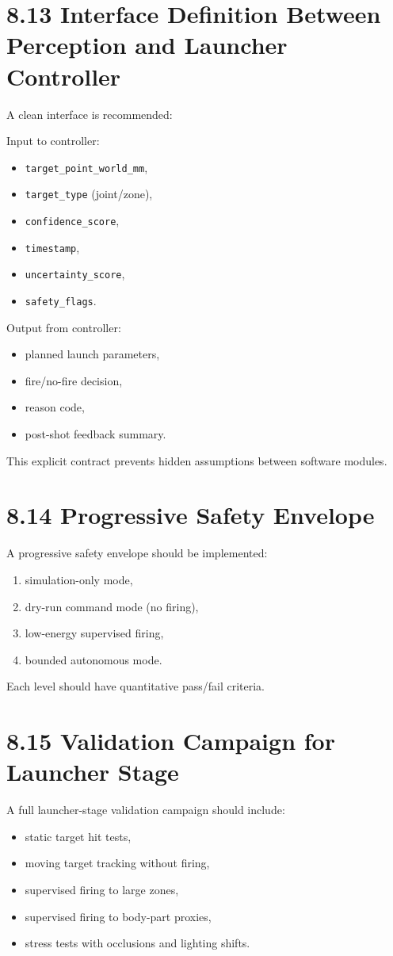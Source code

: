 \section{8.13 Interface Definition Between Perception and Launcher Controller}
A clean interface is recommended:

Input to controller:
\begin{itemize}
  \item \texttt{target\_point\_world\_mm},
  \item \texttt{target\_type} (joint/zone),
  \item \texttt{confidence\_score},
  \item \texttt{timestamp},
  \item \texttt{uncertainty\_score},
  \item \texttt{safety\_flags}.
\end{itemize}

Output from controller:
\begin{itemize}
  \item planned launch parameters,
  \item fire/no-fire decision,
  \item reason code,
  \item post-shot feedback summary.
\end{itemize}

This explicit contract prevents hidden assumptions between software modules.

\section{8.14 Progressive Safety Envelope}
A progressive safety envelope should be implemented:
\begin{enumerate}
  \item simulation-only mode,
  \item dry-run command mode (no firing),
  \item low-energy supervised firing,
  \item bounded autonomous mode.
\end{enumerate}

Each level should have quantitative pass/fail criteria.

\section{8.15 Validation Campaign for Launcher Stage}
A full launcher-stage validation campaign should include:
\begin{itemize}
  \item static target hit tests,
  \item moving target tracking without firing,
  \item supervised firing to large zones,
  \item supervised firing to body-part proxies,
  \item stress tests with occlusions and lighting shifts.
\end{itemize}

